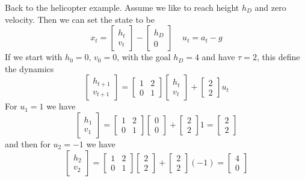 Back to the helicopter example. Assume we like to reach height $h_D$
and zero velocity. Then we can set the state to be
\[
x_t=\begin{bmatrix}
h_{t}\\
v_{t}
\end{bmatrix}- \begin{bmatrix}
h_{D}\\
0
\end{bmatrix}
\;\;\;\; u_t=a_t-g
\]
If we start with $h_0=0$, $v_0=0$, with the goal $h_D=4$ and have
$\tau=2$, this define the dynamics
\[
\begin{bmatrix}
h_{t+1}\\
v_{t+1}
\end{bmatrix}
=
\begin{bmatrix}
1& 2\\
0 & 1
\end{bmatrix}
\begin{bmatrix}
h_{t}\\
v_{t}
\end{bmatrix}
+
\begin{bmatrix}
2\\
2
\end{bmatrix}
u_t
\]
For $u_1=1$ we have
\[
\begin{bmatrix}
h_{1}\\
v_{1}
\end{bmatrix}
=
\begin{bmatrix}
1& 2\\
0 & 1
\end{bmatrix}
\begin{bmatrix}
0\\
0
\end{bmatrix}
+
\begin{bmatrix}
2\\
2
\end{bmatrix}
1
=
\begin{bmatrix}
2\\
2
\end{bmatrix}
\]
and then for $u_2=-1$ we have
\[
\begin{bmatrix}
h_{2}\\
v_{2}
\end{bmatrix}
=
\begin{bmatrix}
1& 2\\
0 & 1
\end{bmatrix}
\begin{bmatrix}
2\\
2
\end{bmatrix}
+
\begin{bmatrix}
2\\
2
\end{bmatrix}
(-1) =
\begin{bmatrix}
4\\
0
\end{bmatrix}
\]

